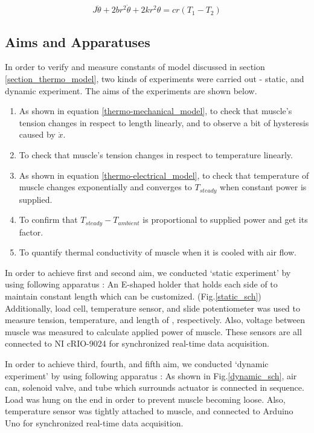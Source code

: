 \begin{equation} \label{EqAnta}
J\ddot{\theta}+2br^2\dot{\theta}+2kr^2\theta=cr(T_1-T_2)
\end{equation}

\subsection{Aims and Apparatuses}\label{section_aimsappa}
In order to verify and measure constants of model discussed in section \ref{section_thermo_model}, two kinds of experiments were carried out - static, and dynamic experiment. The aims of the experiments are shown below.

\begin{enumerate} 
\item As shown in equation \eqref{thermo-mechanical_model}, to check that muscle's tension changes in respect to length linearly, and to observe a bit of hysteresis caused by $\dot{x}$.
\item To check that muscle's tension changes in respect to temperature linearly.
\item As shown in equation \eqref{thermo-electrical_model}, to check that temperature of muscle changes exponentially and converges to $T_{steady}$ when constant power is supplied.
\item To confirm that $T_{steady}-T_{ambient}$ is proportional to supplied power and get its factor. 
\item To quantify thermal conductivity of muscle when it is cooled with air flow.
\end{enumerate}

In order to achieve first and second aim, we conducted `static experiment' by using following apparatus : An E-shaped holder that holds each side of \scp to maintain constant length which can be customized. (Fig.\ref{static_sch}) Additionally, load cell, temperature sensor, and slide potentiometer was used to measure tension, temperature, and length of \scpnospace, respectively. Also, voltage between muscle was measured to calculate applied power of muscle. These sensors are all connected to NI cRIO-9024 for synchronized real-time data acquisition.

In order to achieve third, fourth, and fifth aim, we conducted `dynamic experiment' by using following apparatus : As shown in Fig.\ref{dynamic_sch}, air can, solenoid valve, and tube which surrounds actuator is connected in sequence. Load was hung on the end in order to prevent muscle becoming loose. 
Also, temperature sensor was tightly attached to muscle, and connected to Arduino Uno for synchronized real-time data acquisition.


